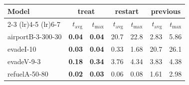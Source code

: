 \begin{tabular}{lrrrrrr}
\toprule
\multirow{2}{*}{Model} & \multicolumn{2}{c}{treat} & \multicolumn{2}{c}{restart} & \multicolumn{2}{c}{previous} \\
    \cmidrule(lr){2-3} \cmidrule(lr){4-5} \cmidrule(lr){6-7}
 & $t_\text{avg}$ & $t_\text{max}$ & $t_\text{avg}$ & $t_\text{max}$ & $t_\text{avg}$ & $t_\text{max}$ \\
\midrule
airportB-3-300-30 & \textbf{0.04} & \textbf{0.04} & 20.7 & 22.8 & 2.83 & 5.86 \\
evadeI-10 & \textbf{0.03} & \textbf{0.04} & 0.33 & 1.68 & 20.7 & 26.1 \\
evadeV-9-3 & \textbf{0.18} & \textbf{0.34} & 3.76 & 4.34 & 3.83 & 4.38 \\
refuelA-50-80 & \textbf{0.02} & \textbf{0.03} & 0.06 & 0.08 & 1.61 & 2.98 \\
\bottomrule
\end{tabular}
